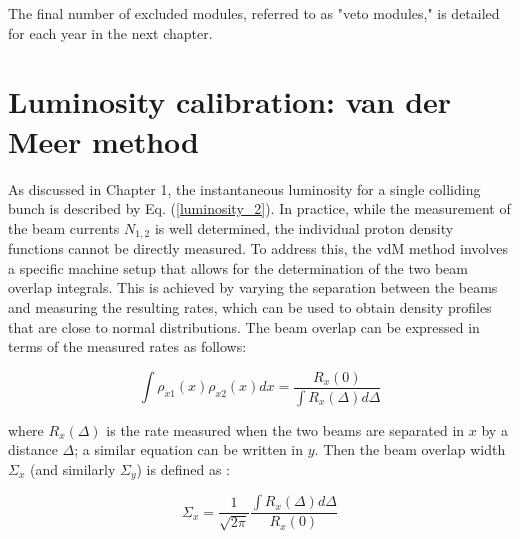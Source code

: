 The final number of excluded modules, referred to as "veto modules," is detailed for each year in the next chapter.




\section{Luminosity calibration: van der Meer method}
\label{vdM method}

As discussed in Chapter 1, the instantaneous luminosity for a single colliding bunch is described by Eq. (\ref{luminosity_2}). In practice, while the measurement of the beam currents $N_{1,2}$ is well determined, the individual proton density functions cannot be directly measured. To address this, the vdM method involves a specific machine setup that allows for the determination of the two beam overlap integrals. This is achieved by varying the separation between the beams and measuring the resulting rates, which can be used to obtain density profiles that are close to normal distributions. The beam overlap can be expressed in terms of the measured rates as follows:

\begin{equation}
\int \rho_{x1}(x) \rho_{x2}(x) dx = \frac{R_{x}(0)}{\int R_{x}(\Delta) d\Delta}
\end{equation}

where $R_{x}(\Delta)$ is the rate measured when the two beams are separated in $x$ by a distance $\Delta$; a similar equation can be written in $y$. Then the beam overlap width $\Sigma_{x}$ (and similarly $\Sigma_{y}$) is defined as \cite{pas_18}:

\begin{equation}
\Sigma_{x}= \frac{1}{\sqrt{2\pi}} \frac{\int R_{x}(\Delta)d\Delta}{R_{x}(0)}
\label{CapSigma}
\end{equation}

